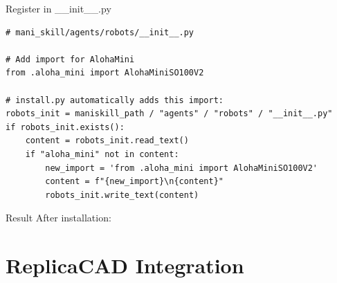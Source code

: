 \documentclass[aspectratio=169]{beamer}
\begin{document}
\begin{frame}[fragile]{Register in \_\_init\_\_.py}
\begin{lstlisting}[basicstyle=\ttfamily\scriptsize]
# mani_skill/agents/robots/__init__.py

# Add import for AlohaMini
from .aloha_mini import AlohaMiniSO100V2

# install.py automatically adds this import:
robots_init = maniskill_path / "agents" / "robots" / "__init__.py"
if robots_init.exists():
    content = robots_init.read_text()
    if "aloha_mini" not in content:
        new_import = 'from .aloha_mini import AlohaMiniSO100V2'
        content = f"{new_import}\n{content}"
        robots_init.write_text(content)
\end{lstlisting}

\begin{block}{Result}
After installation: 
\end{block}
\end{frame}

\section{ReplicaCAD Integration}
\end{document}
